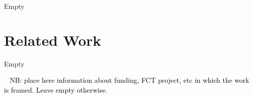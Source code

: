 \documentclass[
  oneside,
  11pt, a4paper,
  footinclude=true,
  headinclude=true,
  cleardoublepage=empty
]{scrbook}
\begin{document}
Empty

\section{Related Work}

Empty

\cleardoublepage



\printindex

    
    \appendix
    \renewcommand\chaptername{Appendix}














\begin{backcover}
\thispagestyle{empty} \pagecolor{white} \textcolor{black} {\selectfont ~\vfill
\noindent
NB: place here information about funding, FCT project, etc in which the work is framed. Leave empty otherwise.
%
\vfill ~}
\end{backcover}
\end{document}
